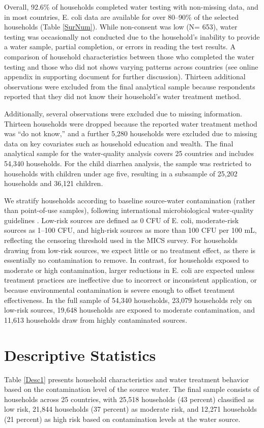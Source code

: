 \documentclass [11pt]{article}
\theoremstyle{plain}
\theoremstyle{definition}
\theoremstyle{remark}
\newcommand{\1}{\bm{1}}
\begin{document}
Overall, 92.6\% of households completed water testing with non-missing data, and in most countries, E. coli data are available for over 80–90\% of the selected households (Table \ref{SurNum}). While non-consent was low (N= 653), water testing was occasionally not conducted due to the household’s inability to provide a water sample, partial completion, or errors in reading the test results. A comparison of household characteristics between those who completed the water testing and those who did not shows varying patterns across countries  (see online appendix in supporting document for further discussion). Thirteen additional observations were excluded from the final analytical sample because respondents reported that they did not know their household’s water treatment method.

Additionally, several observations were excluded due to missing information. Thirteen households were dropped because the reported water treatment method was “do not know,” and a further 5,280 households were excluded due to missing data on key covariates such as household education and wealth. The final analytical sample for the water-quality analysis covers 25 countries and includes 54,340 households. For the child diarrhea analysis, the sample was restricted to households with children under age five, resulting in a subsample of 25,202 households and 36,121 children.

We stratify households according to baseline source-water contamination (rather than point-of-use samples), following international microbiological water-quality guidelines \citep{who_water_guidelines}. Low-risk sources are defined as 0 CFU of E. coli, moderate-risk sources as 1–100 CFU, and high-risk sources as more than 100 CFU per 100 mL, reflecting the censoring threshold used in the MICS survey. For households drawing from low-risk sources, we expect little or no treatment effect, as there is essentially no contamination to remove. In contrast, for households exposed to moderate or high contamination, larger reductions in E. coli are expected unless treatment practices are ineffective due to incorrect or inconsistent application, or because environmental contamination is severe enough to offset treatment effectiveness. In the full sample of 54,340 households, 23,079 households rely on low-risk sources, 19,648 households are exposed to moderate contamination, and 11,613 households draw from highly contaminated sources. 

\section{Descriptive Statistics}\label{Descriptive}
Table \ref{Desc1} presents household characteristics and water treatment behavior based on the contamination level of the source water. The final sample consists of \ToTSample{} households across 25 countries, with 25,518 households (43 percent) classified as low risk, 21,844 households (37 percent) as moderate risk, and 12,271 households (21 percent) as high risk based on contamination levels at the water source.
\end{document}
